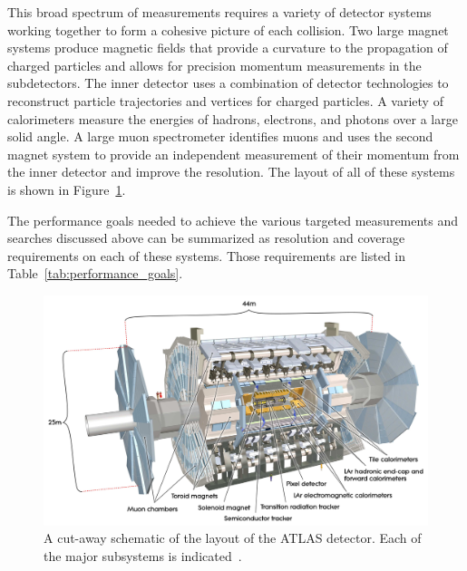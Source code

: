 This broad spectrum of measurements requires a variety of detector systems working together to form a cohesive picture of each collision. 
Two large magnet systems produce magnetic fields that provide a curvature to the propagation of charged particles and allows for precision momentum measurements in the subdetectors.
The inner detector uses a combination of detector technologies to reconstruct particle trajectories and vertices for charged particles.
A variety of calorimeters measure the energies of hadrons, electrons, and photons over a large solid angle.
A large muon spectrometer identifies muons and uses the second magnet system to provide an independent measurement of their momentum from the inner detector and improve the resolution. 
The layout of all of these systems is shown in Figure~\ref{fig:atlas_overview}.


The performance goals needed to achieve the various targeted measurements and searches discussed above can be summarized as resolution and coverage requirements on each of these systems.
Those requirements are listed in Table~\ref{tab:performance_goals}.

\begin{figure}[hbtp]
\includegraphics[width=\fullfig]{figures/atlas_overview.pdf}
\caption{A cut-away schematic of the layout of the ATLAS detector. Each of the major subsystems is indicated~\cite{atlas_experiment}.}
\label{fig:atlas_overview}
\end{figure}

